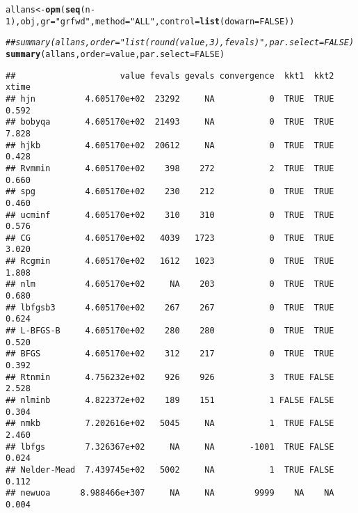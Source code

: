 \documentclass[11pt]{article}\usepackage[]{graphicx}\usepackage[]{color}
\makeatletter
\newcommand{\hlnum}[1]{\textcolor[rgb]{0.686,0.059,0.569}{#1}}%
\newcommand{\hlstr}[1]{\textcolor[rgb]{0.192,0.494,0.8}{#1}}%
\newcommand{\hlcom}[1]{\textcolor[rgb]{0.678,0.584,0.686}{\textit{#1}}}%
\newcommand{\hlopt}[1]{\textcolor[rgb]{0,0,0}{#1}}%
\newcommand{\hlstd}[1]{\textcolor[rgb]{0.345,0.345,0.345}{#1}}%
\newcommand{\hlkwb}[1]{\textcolor[rgb]{0.69,0.353,0.396}{#1}}%
\newcommand{\hlkwc}[1]{\textcolor[rgb]{0.333,0.667,0.333}{#1}}%
\newcommand{\hlkwd}[1]{\textcolor[rgb]{0.737,0.353,0.396}{\textbf{#1}}}%
\newenvironment{kframe}{%
 \def\at@end@of@kframe{}%
 \ifinner\ifhmode%
  \def\at@end@of@kframe{\end{minipage}}%
  \begin{minipage}{\columnwidth}%
 \fi\fi%
 \def\FrameCommand##1{\hskip\@totalleftmargin \hskip-\fboxsep
 \colorbox{shadecolor}{##1}\hskip-\fboxsep
     \hskip-\linewidth \hskip-\@totalleftmargin \hskip\columnwidth}%
 \MakeFramed {\advance\hsize-\width
   \@totalleftmargin\z@ \linewidth\hsize
   \@setminipage}}%
 {\par\unskip\endMakeFramed%
 \at@end@of@kframe}
\newenvironment{knitrout}{}{} %
\makeatother
\begin{document}
\begin{knitrout}\scriptsize
{}\color{fgcolor}\begin{kframe}
\begin{alltt}
\hlstd{allans}\hlkwb{<-} \hlkwd{opm}\hlstd{(}\hlkwd{seq}\hlstd{(n}\hlopt{-}\hlnum{1}\hlstd{), obj,} \hlkwc{gr}\hlstd{=}\hlstr{"grfwd"}\hlstd{,} \hlkwc{method}\hlstd{=}\hlstr{"ALL"}\hlstd{,} \hlkwc{control}\hlstd{=}\hlkwd{list}\hlstd{(}\hlkwc{dowarn}\hlstd{=}\hlnum{FALSE}\hlstd{))}
\end{alltt}


{\ttfamily\noindent{}}

{\ttfamily\noindent{}}

{\ttfamily\noindent\color{warningcolor}{\#\# Warning in nmk(par = spar, fn = efn, control = mcontrol, ...): Nelder-Mead should not be used for high-dimensional optimization}}

{\ttfamily\noindent\color{warningcolor}{\#\# Warning in optimr(par, fn, gr, method = meth, lower = lower, upper = upper, : Maximum number of fevals exceeded\ \ Restarts for stagnation =0}}\begin{alltt}
\hlcom{## summary(allans, order = "list(round(value, 3), fevals)", par.select = FALSE)}
\hlkwd{summary}\hlstd{(allans,} \hlkwc{order} \hlstd{= value,} \hlkwc{par.select} \hlstd{=} \hlnum{FALSE}\hlstd{)}
\end{alltt}
\begin{verbatim}
##                     value fevals gevals convergence  kkt1  kkt2 xtime
## hjn          4.605170e+02  23292     NA           0  TRUE  TRUE 0.592
## bobyqa       4.605170e+02  21493     NA           0  TRUE  TRUE 7.828
## hjkb         4.605170e+02  20612     NA           0  TRUE  TRUE 0.428
## Rvmmin       4.605170e+02    398    272           2  TRUE  TRUE 0.660
## spg          4.605170e+02    230    212           0  TRUE  TRUE 0.460
## ucminf       4.605170e+02    310    310           0  TRUE  TRUE 0.576
## CG           4.605170e+02   4039   1723           0  TRUE  TRUE 3.020
## Rcgmin       4.605170e+02   1612   1023           0  TRUE  TRUE 1.808
## nlm          4.605170e+02     NA    203           0  TRUE  TRUE 0.680
## lbfgsb3      4.605170e+02    267    267           0  TRUE  TRUE 0.624
## L-BFGS-B     4.605170e+02    280    280           0  TRUE  TRUE 0.520
## BFGS         4.605170e+02    312    217           0  TRUE  TRUE 0.392
## Rtnmin       4.756232e+02    926    926           3  TRUE FALSE 2.528
## nlminb       4.822372e+02    189    151           1 FALSE FALSE 0.304
## nmkb         7.202616e+02   5045     NA           1  TRUE FALSE 2.460
## lbfgs        7.326367e+02     NA     NA       -1001  TRUE FALSE 0.024
## Nelder-Mead  7.439745e+02   5002     NA           1  TRUE FALSE 0.112
## newuoa      8.988466e+307     NA     NA        9999    NA    NA 0.004
\end{verbatim}
\end{kframe}
\end{knitrout}
\end{document}
